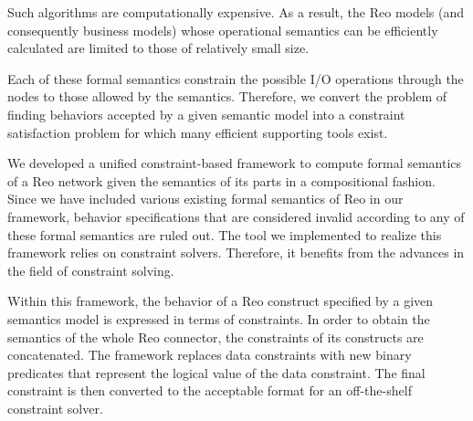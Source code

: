 Such algorithms are computationally expensive. As a result, the Reo models (and consequently business models) whose operational semantics can be efficiently calculated are limited to those of relatively small size. 

Each of these formal semantics constrain the possible I/O operations through the nodes to those allowed by the semantics. Therefore, we convert the problem of finding behaviors accepted by a given semantic model into a constraint satisfaction problem for which many efficient supporting tools exist.

%
%

We developed a unified constraint-based framework to compute formal semantics of a Reo network given the semantics of  its parts in a compositional fashion. Since we have included various existing formal semantics of Reo  in our framework, behavior specifications that are considered invalid according to any of these formal semantics are ruled out. The  tool we implemented to realize this framework relies on  constraint solvers. Therefore, it benefits from the advances in the field of constraint solving.

Within this framework, the behavior of a Reo construct specified by a given semantics model is expressed in terms of constraints. %
 In order to obtain the semantics of the whole Reo connector, the constraints of its constructs are concatenated. The framework replaces data constraints with new binary predicates that represent the logical value of the data constraint. The final constraint is then converted to the acceptable format for an off-the-shelf constraint solver. 

